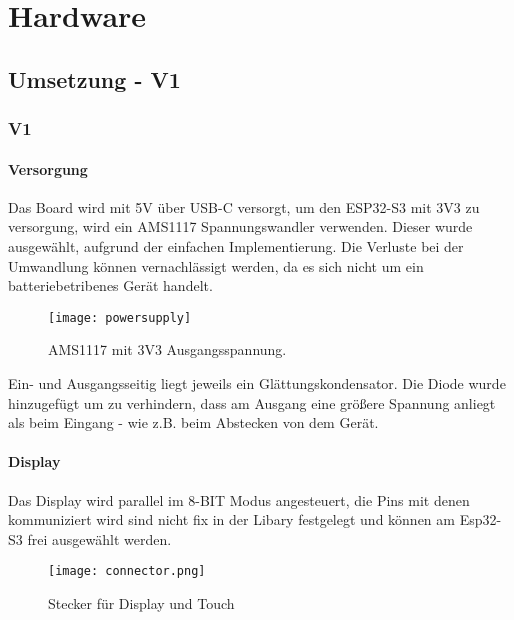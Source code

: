 \graphicspath{ {HW-PIC/} }


\chapter{Hardware}

    \section{Umsetzung - V1}
    
    \subsection{V1}
        \subsubsection{Versorgung}
        Das Board wird mit 5V über USB-C versorgt, um den ESP32-S3 mit 3V3 zu 
        versorgung, wird ein AMS1117 Spannungswandler verwenden. Dieser wurde ausgewählt, 
        aufgrund der einfachen Implementierung. Die Verluste bei der Umwandlung können vernachlässigt werden, da 
        es sich nicht um ein batteriebetribenes Gerät handelt.
            \begin{figure}[h]
                \centering
                \texttt{[image: powersupply]}
                \caption{AMS1117 mit 3V3 Ausgangsspannung.}
                \label{fig:sch1}
                
            \end{figure}

        Ein- und Ausgangsseitig liegt jeweils ein Glättungskondensator. Die Diode wurde hinzugefügt 
        um zu verhindern, dass am Ausgang eine größere Spannung
        anliegt als beim Eingang - wie z.B. beim Abstecken von dem Gerät.

        \newpage
        \subsubsection{Display}
        Das Display wird parallel im 8-BIT Modus angesteuert, die Pins mit denen 
        kommuniziert wird sind nicht fix in der Libary festgelegt und können am Esp32-S3 
        frei ausgewählt werden. 

            \begin{figure}[h!]
                \centering
                \texttt{[image: connector.png]}
                \caption{Stecker für Display und Touch}
                \label{fig:sch2}

            \end{figure}

